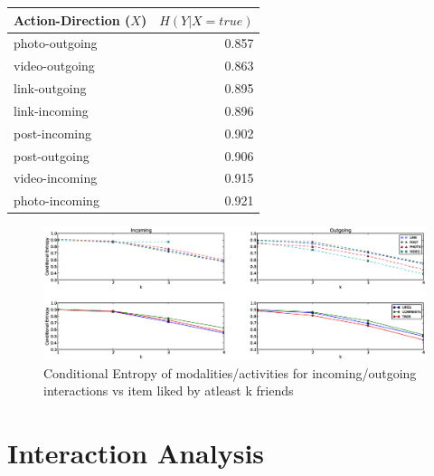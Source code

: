 \begin{table}
{\begin{tabular}{| >{\small}l | >{\small}r | }
                \hline	
		\textbf{Action-Direction} ($X$) & $H(Y|X=true)$ \\
		\hline
		photo-outgoing & 0.857 \\
		video-outgoing & 0.863 \\
		link-outgoing & 0.895 \\
		link-incoming & 0.896 \\
		post-incoming & 0.902 \\
		post-outgoing & 0.906 \\
		video-incoming & 0.915 \\
		photo-incoming & 0.921 \\
		\hline
				
	\end{tabular}}
\end{table}

\begin{figure}[tbp!]
\hspace{-10mm}
\includegraphics[width=200mm]{data/plots/vsk/ModalityActionsvsKFriends.eps}
\caption{Conditional Entropy  of modalities/activities for incoming/outgoing interactions vs item liked by atleast k friends}
\label{Fig2}
\end{figure}

\section{Interaction Analysis}

